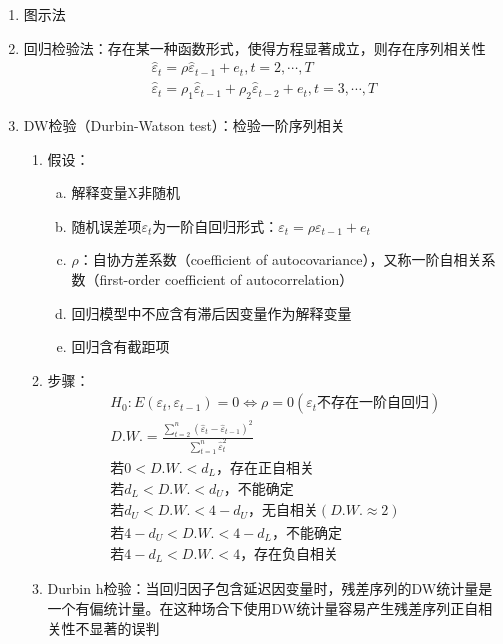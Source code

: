 \documentclass[12pt]{book}
\begin{document}
\begin{enumerate}[1.]
    \item 图示法
    \item 回归检验法：存在某一种函数形式，使得方程显著成立，则存在序列相关性
    \begin{gather*}
    {\hat{\varepsilon}}_t=\rho{\hat{\varepsilon}}_{t-1}+e_t, t=2,\cdots,T\\ 
    {\hat{\varepsilon}}_t=\rho_1{\hat{\varepsilon}}_{t-1}+\rho_2{\hat{\varepsilon}}_{t-2}+e_t,t=3,⋯,T
    \end{gather*}
    \item DW检验（Durbin-Watson test）：检验一阶序列相关
    \begin{enumerate}[(1)]
        \item 假设：
        \begin{enumerate}[a.]
            \item 解释变量X非随机  
            \item 随机误差项$\varepsilon_t$为一阶自回归形式：$\varepsilon_t=\rho\varepsilon_{t-1}+e_t$  
            \item $\rho$：自协方差系数（coefficient of autocovariance），又称一阶自相关系数（first-order coefficient of autocorrelation）  
            \item 回归模型中不应含有滞后因变量作为解释变量  
            \item 回归含有截距项
        \end{enumerate}
        \item 步骤：
        \begin{gather*}
            H_0: E(\varepsilon _{t},\varepsilon _{t-1})=0\Leftrightarrow \rho =0(\varepsilon _{t}\text{不存在一阶自回归})\\ 
            D.W.=\frac{\sum_{t=2}^{n}\left({\hat{\varepsilon}}_t-{\hat{\varepsilon}}_{t-1}\right)^2}{\sum_{t=1}^{n}{\hat{\varepsilon}}_t^2}\\ 
            \text{若}0<D.W.<d_{L} \text{，存在正自相关}\\ 
            \text{若}d_{L}<D.W.<d_{U} \text{，不能确定}\\ 
            \text{若}d_{U}<D.W.<4-d_{U} \text{，无自相关}(D.W.\approx 2)\\ 
            \text{若}4-d_{U}<D.W.<4-d_{L} \text{，不能确定}\\ 
            \text{若}4-d_{L}<D.W.<4 \text{，存在负自相关}
        \end{gather*}
        \item Durbin h检验：当回归因子包含延迟因变量时，残差序列的DW统计量是一个有偏统计量。在这种场合下使用DW统计量容易产生残差序列正自相关性不显著的误判

\end{enumerate}
\end{enumerate}
\end{document}
